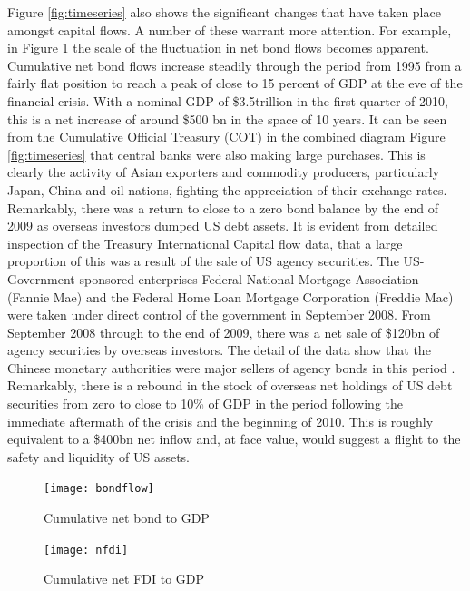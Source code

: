 \documentclass[12pt, a4paper, oneside]{article}\usepackage[]{graphicx}\usepackage[]{color}
\begin{document}
Figure \ref{fig:timeseries} also shows the significant changes that have taken place amongst capital flows.  A number of these warrant more attention.  For example, in Figure \ref{fig:bond} the scale of the fluctuation in net bond flows becomes apparent.   Cumulative net bond flows increase steadily through the period from 1995 from a fairly flat position to reach a peak of close to 15 percent of GDP at the eve of the financial crisis.  With a nominal GDP of \$3.5trillion in the first quarter of 2010, this is a net increase of around \$500 bn in the space of 10 years.  It can be seen from the Cumulative Official Treasury (COT) in the combined diagram Figure \ref{fig:timeseries} that central banks were also making large purchases.  This is clearly the activity of Asian exporters and commodity producers, particularly Japan, China and oil nations, fighting the appreciation of their exchange rates.  Remarkably, there was a return to close to a zero bond balance by the end of 2009 as overseas investors dumped US debt assets.  It is evident from detailed inspection of the Treasury International Capital flow data,  that a large proportion of this was a result of the sale of US agency securities.  The US-Government-sponsored enterprises Federal National Mortgage Association (Fannie Mae) and the Federal Home Loan Mortgage Corporation (Freddie Mac) were taken under direct control of the government in September 2008.  From September 2008 through to the end of 2009, there was a net sale of \$120bn of agency securities by overseas investors.  The detail of the data show that the Chinese monetary authorities were major sellers of agency bonds in this period \citep{TIC}.   %
Remarkably, there is a rebound in the stock of overseas net holdings of US debt securities from zero to close to 10\% of GDP in the period following the immediate aftermath of the crisis and the beginning of 2010.  This is roughly equivalent to a \$400bn net inflow and, at face value, would suggest a flight to the safety and liquidity of US assets.  

\begin{figure}[h!]
\graphicspath{{Pictures/C2/}}
\centering
\caption{Cumulative net bond to GDP}
\label{fig:bond}
\texttt{[image: bondflow]}
\end{figure}

\begin{figure}[h!]
\graphicspath{{Pictures/C2/}}
\centering
\caption{Cumulative net FDI to GDP}
\label{fig:nfdi}
\texttt{[image: nfdi]}
\end{figure}
\end{document}
